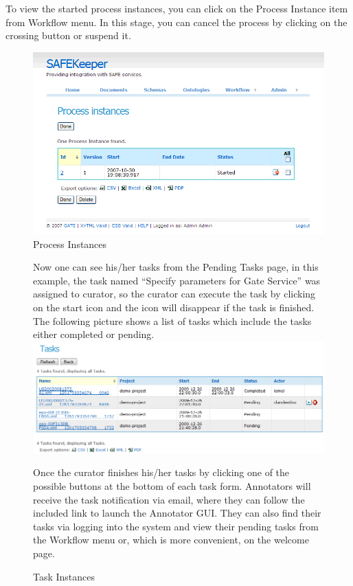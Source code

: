 To view the started process instances, you can click on the Process
Instance item from Workflow menu. In this stage, you can cancel the 
process by clicking on the crossing button or suspend it.
\begin{figure}[htb]
\includegraphics[scale=0.4]{processinstancelist}
\caption{Process Instances}
\label{fig:processinstancelist}
\end{figure}

\begin{figure}[htb]
Now one can see his/her tasks from the Pending Tasks page, in this 
example, the task named “Specify parameters for Gate Service” was 
assigned to curator, so the curator can execute the task by clicking
on the start icon and the icon will disappear if the task is finished.
The following picture shows a list of tasks which include the tasks
either completed or pending.
\newline
\newline
\includegraphics[scale=0.4]{taskinstances}
\caption{Task Instances}
\label{fig:taskinstances}

Once the curator finishes his/her tasks by clicking one of the possible
buttons at the bottom of each task form. Annotators will receive the 
task notification via email, where they can follow the included link to 
launch the Annotator GUI. They can also find their tasks via logging 
into the system and view their pending tasks from the Workflow menu or,
which is more convenient, on the welcome page.
\end{figure}
\newpage
\clearpage
